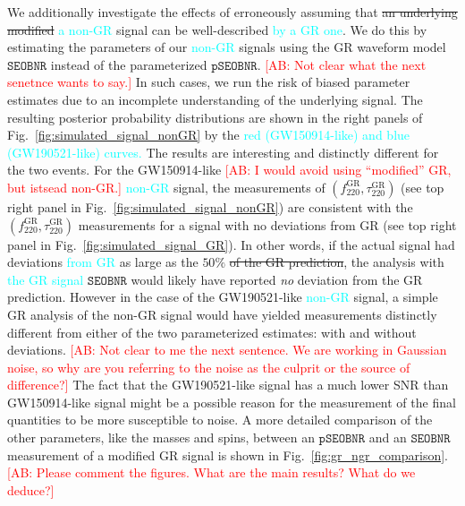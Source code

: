 \documentclass[twocolumn,prd,aps,superscriptaddress,preprintnumbers,tightenlines,showpacs,nofootinbib,eqsecnum,amsfonts,amsmath]{revtex4-1}
\newcommand{\ab}[1]{\textcolor{cyan}{#1}}
\newcommand{\comment}[1]{\textcolor{red}{[#1]}}
\newcommand{\fgr}[1]{f ^{\text{GR}}_{\text{#1}}}
\newcommand{\taugr}[1]{\tau ^{\text{GR}}_{\text{#1}}}
\newcommand{\pSEOB}{\texttt{pSEOBNR}}
\newcommand{\SEOB}{\texttt{SEOBNR}}
\begin{document}
We additionally investigate the effects of erroneously assuming that
\sout{an underlying modified} \ab{a non-GR} signal can be well-described 
\ab{by a GR one}. We do this by estimating the parameters of our \ab{non-GR} 
signals using the GR waveform model $\SEOB$ instead of the parameterized 
$\pSEOB$. \comment{AB: Not clear what the next senetnce wants to say.} 
In such cases, we run the risk of biased parameter estimates due to an
incomplete understanding of the underlying signal. The resulting
posterior probability distributions are shown in the right panels of
Fig.~\ref{fig:simulated_signal_nonGR} by the \ab{red (GW150914-like) and blue 
(GW190521-like) curves.} The results are interesting and distinctly
different for the two events. For the GW150914-like \comment{AB: I would avoid using 
``modified'' GR, but istsead non-GR.} \ab{non-GR} signal, the measurements of $(\fgr{220}, \taugr{220})$
(see top right panel in Fig.~\ref{fig:simulated_signal_nonGR}) are consistent
with the $(\fgr{220}, \taugr{220})$ measurements for a signal with no
deviations from GR (see top right panel in Fig.~\ref{fig:simulated_signal_GR}). In other
words, if the actual signal had deviations \ab{from GR} as large as the $50\%$ \sout{of
the GR prediction}, the analysis with \ab{the GR signal} $\SEOB$ would likely have
reported \emph{no} deviation from the GR prediction. However in the
case of the GW190521-like \ab{non-GR} signal, a simple GR analysis of
the non-GR signal would have yielded measurements distinctly
different from either of the two parameterized estimates: with and
without deviations. \comment{AB: Not clear to me the next sentence. We are working 
in Gaussian noise, so why are you referring to the noise as the culprit or the 
source of difference?} The fact that the GW190521-like signal has a much
lower SNR than GW150914-like signal might be a possible reason for the 
measurement of the final quantities to be more susceptible to noise. A
more detailed comparison of the other parameters, like the masses and
spins, between an $\pSEOB$ and an $\SEOB$ measurement of a modified GR
signal is shown in Fig.~\ref{fig:gr_ngr_comparison}. \comment{AB: Please 
comment the figures. What are the main results? What do we deduce?}
\end{document}
